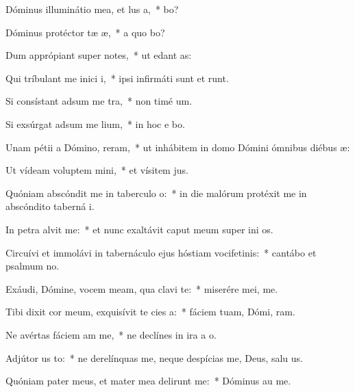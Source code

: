 \item Dóminus illuminátio mea, et lus a,~*  bo?
\item Dóminus protéctor tæ æ,~* a quo bo?
\item Dum apprópiant super  notes,~* ut edant  as:
\item Qui tríbulant me inici i,~* ipsi infirmáti sunt et runt.
\item Si consístant adsum me tra,~* non timé  um.
\item Si exsúrgat adsum me lium,~* in hoc e bo.
\item Unam pétii a Dómino,  reram,~* ut inhábitem in domo Dómini ómnibus diébus  æ:
\item Ut vídeam voluptem mini,~* et vísitem  jus.
\item Quóniam abscóndit me in taberculo o:~* in die malórum protéxit me in abscóndito taberná i.
\item In petra alvit me:~* et nunc exaltávit caput meum super ini os.
\item Circuívi et immolávi in tabernáculo ejus hóstiam vocifetinis:~* cantábo et psalmum  no.
\item Exáudi, Dómine, vocem meam, qua clavi  te:~* miserére mei,   me.
\item Tibi dixit cor meum, exquisívit te cies a:~* fáciem tuam, Dómi, ram.
\item Ne avértas fáciem am  me,~* ne declínes in ira a  o.
\item Adjútor us to:~* ne derelínquas me, neque despícias me, Deus, salu us.
\item Quóniam pater meus, et mater mea delirunt me:~* Dóminus au  me.
